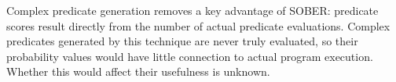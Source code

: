 Complex predicate generation removes a key advantage of SOBER: predicate scores result directly from the number of actual predicate evaluations.  Complex predicates generated by this technique are never truly evaluated, so their probability values would have little connection to actual program execution.  Whether this would affect their usefulness is unknown.

